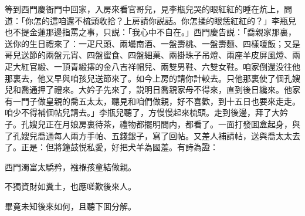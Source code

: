 等到西門慶衙門中回家，入房來看官哥兒，見李瓶兒哭的眼紅紅的睡在炕上，問道：「你怎的這咱還不梳頭收拾？上房請你説話。你怎揉的眼恁紅紅的？」李瓶兒也不提金蓮那邊指罵之事，只説：「我心中不自在。」西門慶告説：「喬親家那裏，送你的生日禮來了：一疋尺頭、兩壜南酒、一盤壽桃、一盤壽麵、四樣嗄飯；又是哥兒送節的兩盤元宵、四盤蜜食、四盤細菓、兩掛珠子吊燈、兩座羊皮屏風燈、兩疋大紅官緞、一頂青緞㩟的金八吉祥帽兒、兩雙男鞋、六雙女鞋。咱家倒還没往他那裏去，他又早與咱孩兒送節來了。如今上房的請你計較去。只他那裏使了個孔嫂兒和喬通押了禮來。大妗子先來了，説明日喬親家母不得來，直到後日纔來。他家有一門子做皇親的喬五太太，聽見和咱們做親，好不喜歡，到十五日也要來走走。咱少不得補個帖兒請去。」李瓶兒聽了，方慢慢起來梳頭。走到後邊，拜了大妗子。孔嫂兒正在月娘房裏待茶，禮物都擺明間内，都看了。一面打發囬盒起身，與了孔嫂兒喬通每人兩方手帕、五錢銀子，寫了回帖。又差人補請帖，送與喬太太去了。正是：但將鐘鼓悦私愛，好把犬羊為國羞。有詩為證：

\begin{myquote}
西門濁富太驕矜，襁褓孩童結做親。

不獨資財如糞土，也應嗟歎後來人。
\end{myquote}

畢竟未知後來如何，且聽下囬分解。


